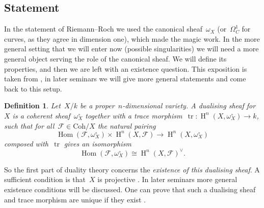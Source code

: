 \documentclass[10pt,a4paper]{article}
\theoremstyle{lecture}
\newtheorem{definition}[theorem]{Definition}
\newcommand\dash{\nobreakdash-\hspace{0pt}}
\newcommand\Coh{\ensuremath{\mathrm{Coh}}}
\DeclareMathOperator\HH{H}
\DeclareMathOperator\Hom{Hom}
\DeclareMathOperator\tr{tr}
\begin{document}
\subsection{Statement}
\label{subsection:serre-duality-statement}
In the statement of Riemann--Roch we used the canonical sheaf~$\omega_X$ (or~$\Omega_C^1$ for curves, as they agree in dimension one), which made the magic work. In the more general setting that we will enter now (possible singularities) we will need a more general object serving the role of the canonical sheaf. We will define its properties, and then we are left with an existence question. This exposition is taken from \cite[\S III.7]{hartshorne-algebraic-geometry}, in later seminars we will give more general statements and come back to this setup.
\begin{definition}
  Let~$X/k$ be a proper~$n$\dash dimensional variety. A \emph{dualising sheaf} for~$X$ is a coherent sheaf~$\omega_X^\circ$ together with a \emph{trace morphism}~$\tr\colon\HH^n(X,\omega_X^\circ)\to k$, such that for all~$\mathcal{F}\in\Coh/X$ the natural pairing
  \begin{equation}
    \Hom(\mathcal{F},\omega_X^\circ)\times\HH^n(X,\mathcal{F})\to\HH^n(X,\omega_X^\circ)
  \end{equation}
  composed with~$\tr$ gives an isomorphism
  \begin{equation}
    \Hom(\mathcal{F},\omega_X^\circ)\cong\HH^n(X,\mathcal{F})^\vee.
  \end{equation}
\end{definition}
So the first part of duality theory concerns the \emph{existence of this dualising sheaf}. A sufficient condition is that~$X$ is projective \cite[proposition III.7.5]{hartshorne-algebraic-geometry}. In later seminars more general existence conditions will be discussed. One can prove that such a dualising sheaf and trace morphism are unique if they exist \cite[proposition III.7.2]{hartshorne-algebraic-geometry}.
\end{document}
